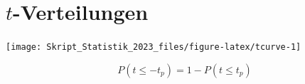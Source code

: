 \documentclass[
  11pt,
  ngerman,
  a4paper,
]{report}
\begin{document}
\pagebreak

\hypertarget{tabelle-t}{%
\section*{\texorpdfstring{\(t\)-Verteilungen}{t-Verteilungen}}\label{tabelle-t}}

\begin{multicols}{2}
\vfill


\begin{center}\texttt{[image: Skript\_Statistik\_2023\_files/figure-latex/tcurve-1]} \end{center}

\vfill
\columnbreak
\vfill
\[ P(t\leq -t_p)= 1 - P(t\leq t_p) \]
\vfill
\end{multicols}
\end{document}
